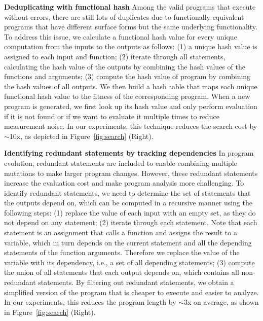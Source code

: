 \documentclass{article}
\begin{document}



\textbf{Deduplicating with functional hash} 
Among the valid programs that execute without errors, there are still lots of duplicates due to functionally equivalent programs that have different surface forms but the same underlying functionality. 
To address this issue, we calculate a functional hash value for every unique computation from the inputs to the outputs as follows: (1) a unique hash value is assigned to each input and function; (2) iterate through all statements, calculating the hash value of the outputs by combining the hash values of the functions and arguments; (3) compute the hash value of program by combining the hash values of all outputs. 
We then build a hash table that maps each unique functional hash value to the fitness of the corresponding program. When a new program is generated, we first look up its hash value and only perform evaluation if it is not found or if we want to evaluate it multiple times to reduce measurement noise. In our experiments, this technique reduces the search cost by $\sim$10x, as depicted in Figure~\ref{fig:search} (Right).





\textbf{Identifying redundant statements by tracking dependencies}
In program evolution, redundant statements are included to enable combining multiple mutations to make larger program changes.
However, these redundant statements increase the evaluation cost and make program analysis more challenging.
To identify redundant statements, we need to determine the set of statements that the outputs depend on, which can be computed in a recursive manner using the following steps: 
(1) replace the value of each input with an empty set, as they do not depend on any statement; (2) iterate through each statement. Note that each statement is an assignment that calls a function and assigns the result to a variable, which in turn depends on the current statement and all the depending statements of the function arguments. Therefore we replace the value of the variable with its dependency, i.e., a set of all depending statements; (3) compute the union of all statements that each output depends on, which contains all non-redundant statements. 
By filtering out redundant statements, we obtain a simplified version of the program that is cheaper to execute and easier to analyze.
In our experiments, this reduces the program length by $\sim$3x on average, as shown in Figure~\ref{fig:search} (Right).
\end{document}
